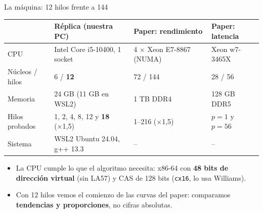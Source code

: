 \documentclass[aspectratio=169,11pt]{beamer}
\newcommand{\clave}[1]{\textcolor{acento}{\textbf{#1}}}
\begin{document}
\begin{frame}{La máquina: 12 hilos frente a 144}
  \small
  \begin{tabularx}{\linewidth}{@{}l X X X@{}}
    \toprule
    & \textbf{Réplica (nuestra PC)} & \textbf{Paper: rendimiento} & \textbf{Paper: latencia}\\
    \midrule
    CPU & Intel Core i5-10400, 1 socket & 4 × Xeon E7-8867 (NUMA) & Xeon w7-3465X\\
    Núcleos / hilos & 6 / \textbf{12} & 72 / 144 & 28 / 56\\
    Memoria & 24 GB (11 GB en WSL2) & 1 TB DDR4 & 128 GB DDR5\\
    Hilos probados & 1, 2, 4, 8, 12 y \textbf{18} (×1,5) & 1--216 (×1,5) & $p=1$ y $p=56$\\
    Sistema & WSL2 Ubuntu 24.04, g++ 13.3 & -- & --\\
    \bottomrule
  \end{tabularx}
  \bigskip
  \begin{itemize}\small
    \item La CPU cumple lo que el algoritmo necesita: x86-64 con \textbf{48 bits de dirección virtual} (sin LA57) y CAS de 128 bits (\texttt{cx16}, lo usa Williams).
    \item Con 12 hilos vemos el comienzo de las curvas del paper: comparamos \clave{tendencias y proporciones}, no cifras absolutas.
  \end{itemize}
\end{frame}
\end{document}
